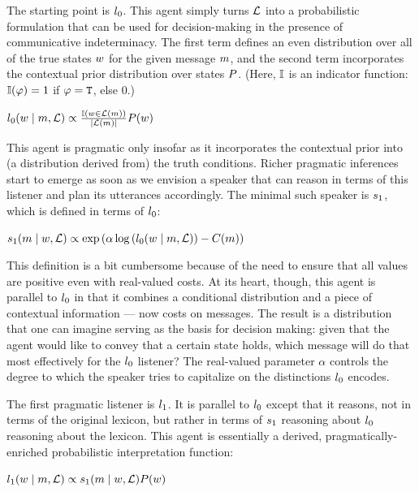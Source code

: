 \documentclass[12pt,twoside]{article}
\renewcommand{\_}{\textbf{\textunderscore\hspace{-4pt}\textunderscore\hspace{-3pt}\textunderscore\hspace{-4pt}\textunderscore}\hspace{0.5pt}}			%
\begin{document}
The starting point is $l_{0}$. This agent simply turns $\mathcal{L}$
into a probabilistic formulation that can be used for decision-making
in the presence of communicative indeterminacy. The first term defines
an even distribution over all of the true states $w$ for the
given message $m$, and the second term incorporates the contextual
prior distribution over states $P$. (Here, $\mathbb{I}$ is an
indicator function: $\mathbb{I}(\varphi) = 1$ if $\varphi = \texttt{T}$,
else $0$.)
%
\begin{exe}
\ex\label{l0} $l_{0}(w \mid m, \mathcal{L}) \propto \frac{\mathbb{I}(w \in \mathcal{L}(m))}{|\mathcal{L}(m)|} P(w)$
\end{exe}

This agent is pragmatic only insofar as it incorporates the contextual
prior into (a distribution derived from) the truth conditions. Richer
pragmatic inferences start to emerge as soon as we envision a speaker
that can reason in terms of this listener and plan its utterances
accordingly. The minimal such speaker is $s_{1}$, which is
defined in terms of $l_{0}$:
%
\begin{exe}
\ex\label{s1} $s_{1}(m \mid w, \mathcal{L}) \propto \operatorname{exp} \left( \alpha\log \left( l_{0}(w \mid m, \mathcal{L}) \right) -  C(m) \right)$
\end{exe}
%
This definition is a bit cumbersome because of the need to ensure that
all values are positive even with real-valued costs. At its heart,
though, this agent is parallel to $l_{0}$ in that it combines
a conditional distribution and a piece of contextual information ---
now costs on messages. The result is a distribution that one can
imagine serving as the basis for decision making: given that the agent
would like to convey that a certain state holds, which message will do
that most effectively for the $l_{0}$ listener? The
real-valued parameter $\alpha$ controls the degree to which the
speaker tries to capitalize on the distinctions $l_{0}$
encodes.

The first pragmatic listener is $l_{1}$. It is parallel to
$l_{0}$ except that it reasons, not in terms of the original
lexicon, but rather in terms of $s_{1}$ reasoning about
$l_{0}$ reasoning about the lexicon. This agent is essentially
a derived, pragmatically-enriched probabilistic interpretation
function:
%
\begin{exe}
\ex\label{l1} $l_{1}(w \mid m, \mathcal{L}) \propto s_{1}(m \mid w, \mathcal{L}) P(w)$
\end{exe}
\end{document}
